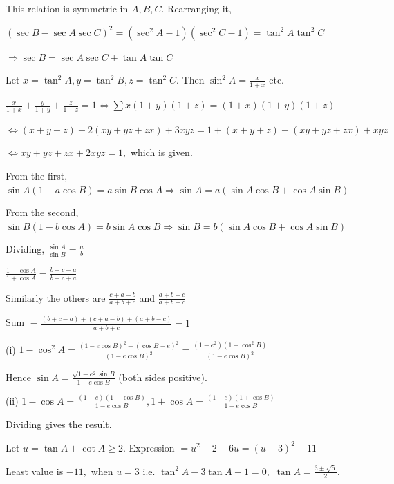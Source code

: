     This relation is symmetric in $A, B, C$. Rearranging it,

    $(\sec B - \sec A\sec C)^2 = (\sec^2 A - 1)(\sec^2 C - 1) = \tan^2 A\tan^2 C$

    $\Rightarrow \sec B = \sec A\sec C \pm \tan A\tan C$

\item Let $x = \tan^2 A, y = \tan^2 B, z = \tan^2 C$. Then $\sin^2 A = \frac{x}{1 + x}$ etc.

    $\frac{x}{1 + x} + \frac{y}{1 + y} + \frac{z}{1 + z} = 1 \Leftrightarrow \sum x(1 + y)(1 + z) = (1 + x)(1 + y)(1 + z)$

    $\Leftrightarrow (x + y + z) + 2(xy + yz + zx) + 3xyz = 1 + (x + y + z) + (xy + yz + zx) + xyz$

    $\Leftrightarrow xy + yz + zx + 2xyz = 1,$ which is given.

\item From the first, $\sin A(1 - a\cos B) = a\sin B\cos A \Rightarrow \sin A = a(\sin A\cos B + \cos A\sin B)$

    From the second, $\sin B(1 - b\cos A) = b\sin A\cos B \Rightarrow \sin B = b(\sin A\cos B + \cos A\sin B)$

    Dividing, $\frac{\sin A}{\sin B} = \frac{a}{b}$

\item $\frac{1 - \cos A}{1 + \cos A} = \frac{b + c - a}{b + c + a}$

    Similarly the others are $\frac{c + a - b}{a + b + c}$ and $\frac{a + b - c}{a + b + c}$

    Sum $= \frac{(b + c - a) + (c + a - b) + (a + b - c)}{a + b + c} = 1$

\item (i) $1 - \cos^2 A = \frac{(1 - e\cos B)^2 - (\cos B - e)^2}{(1 - e\cos B)^2} = \frac{(1 - e^2)(1 - \cos^2 B)}{(1 - e\cos
    B)^2}$

    Hence $\sin A = \frac{\sqrt{1 - e^2}\sin B}{1 - e\cos B}$ (both sides positive).

    (ii) $1 - \cos A = \frac{(1 + e)(1 - \cos B)}{1 - e\cos B}, 1 + \cos A = \frac{(1 - e)(1 + \cos B)}{1 - e\cos B}$

    Dividing gives the result.

\item Let $u = \tan A + \cot A \geq 2$. Expression $= u^2 - 2 - 6u = (u - 3)^2 - 11$

    Least value is $-11,$ when $u = 3$ i.e. $\tan^2 A - 3\tan A + 1 = 0,$ $\tan A = \frac{3 \pm \sqrt{5}}{2}$.

